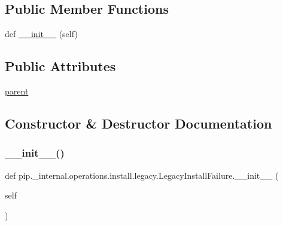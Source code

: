 \subsection*{Public Member Functions}
\begin{DoxyCompactItemize}
\item 
def \hyperlink{classpip_1_1__internal_1_1operations_1_1install_1_1legacy_1_1LegacyInstallFailure_ab108ac4f7571e77e1b6d4ad0787e92e7}{\+\_\+\+\_\+init\+\_\+\+\_\+} (self)
\end{DoxyCompactItemize}
\subsection*{Public Attributes}
\begin{DoxyCompactItemize}
\item 
\hyperlink{classpip_1_1__internal_1_1operations_1_1install_1_1legacy_1_1LegacyInstallFailure_a23ae72a55e4dd022d2de7182cf234674}{parent}
\end{DoxyCompactItemize}


\subsection{Constructor \& Destructor Documentation}
\mbox{\label{classpip_1_1__internal_1_1operations_1_1install_1_1legacy_1_1LegacyInstallFailure_ab108ac4f7571e77e1b6d4ad0787e92e7}} 
\subsubsection{\texorpdfstring{\+\_\+\+\_\+init\+\_\+\+\_\+()}{\_\_init\_\_()}}
{\footnotesize\ttfamily def pip.\+\_\+internal.\+operations.\+install.\+legacy.\+Legacy\+Install\+Failure.\+\_\+\+\_\+init\+\_\+\+\_\+ (\begin{DoxyParamCaption}\item[{}]{self }\end{DoxyParamCaption})}



